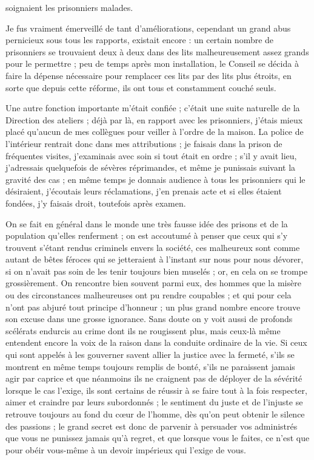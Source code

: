\documentclass[11pt,a4paper]{report}
\begin{document}
soignaient les prisonniers malades.

Je fus vraiment émerveillé de tant d'améliorations, cependant un grand abus pernicieux sous tous les rapports, existait encore : un certain nombre de prisonniers se trouvaient deux à deux dans des lits malheureusement assez grands pour le permettre ; peu de temps après mon installation, le Conseil se décida à faire la dépense nécessaire pour remplacer ces lits par des lits plus étroits, en sorte que depuis cette réforme, ils ont tous et constamment couché seuls.

Une autre fonction importante m'était confiée ; c'était une suite naturelle de la Direction des ateliers ; déjà par là, en rapport avec les prisonniers, j'étais mieux placé qu'aucun de mes collègues pour veiller à l'ordre de la maison. La police de l'intérieur rentrait donc dans mes attributions ; je faisais dans la prison de fréquentes visites, j'examinais avec soin si tout était en ordre ; s'il y avait lieu, j'adressais quelquefois de sévères réprimandes, et même je punissais suivant la gravité des cas ; en même temps je donnais audience à tous les prisonniers qui le désiraient, j'écoutais leurs réclamations, j'en prenais acte et si elles étaient fondées, j'y faisais droit, toutefois après examen.

On se fait en général dans le monde une très fausse idée des prisons et de la population qu'elles renferment ; on est accoutumé à penser que ceux qui s'y trouvent s'étant rendus criminels envers la société, ces malheureux sont comme autant de bêtes féroces qui se jetteraient à l'instant sur nous pour nous dévorer, si on n'avait pas soin de les tenir toujours bien muselés ; or, en cela on se trompe grossièrement. On rencontre bien souvent parmi eux, des hommes que la misère ou des circonstances malheureuses ont pu rendre coupables ; et qui pour cela n'ont pas abjuré tout principe d'honneur ; un plus grand nombre encore trouve son excuse dans une grosse ignorance. Sans doute on y voit aussi de profonds scélérats endurcis au crime dont ils ne rougissent plus, mais ceux-là même entendent encore la voix de la raison dans la conduite ordinaire de la vie. Si ceux qui sont appelés à les gouverner savent allier la justice avec la fermeté, s'ils se montrent en même temps toujours remplis de bonté, s'ils ne paraissent jamais agir par caprice et que néanmoins ils ne craignent pas de déployer de la sévérité lorsque le cas l'exige, ils sont certains de réussir à se faire tout à la fois respecter, aimer et craindre par leurs subordonnés ; le sentiment du juste et de l'injuste se retrouve toujours au fond du cœur de l'homme, dès qu'on peut obtenir le silence des passions ; le grand secret est donc de parvenir à persuader vos administrés que vous ne punissez jamais qu'à regret, et que lorsque vous le faites, ce n'est que pour obéir vous-même à un devoir impérieux qui l'exige de vous.
\end{document}
